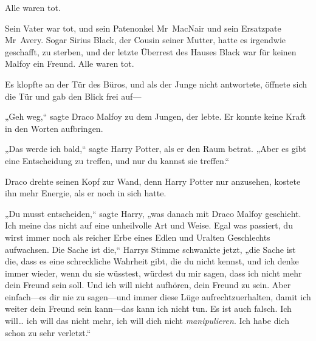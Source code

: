Alle waren tot.

Sein Vater war tot, und sein Patenonkel Mr~MacNair und sein Ersatzpate Mr~Avery. Sogar Sirius Black, der Cousin seiner Mutter, hatte es irgendwie geschafft, zu sterben, und der letzte Überrest des Hauses Black war für keinen Malfoy ein Freund. Alle waren tot.

Es klopfte an der Tür des Büros, und als der Junge nicht antwortete, öffnete sich die Tür und gab den Blick frei auf—

„Geh weg,“ sagte Draco Malfoy zu dem Jungen, der lebte. Er konnte keine Kraft in den Worten aufbringen.

„Das werde ich bald,“ sagte Harry Potter, als er den Raum betrat. „Aber es gibt eine Entscheidung zu treffen, und nur du kannst sie treffen.“

Draco drehte seinen Kopf zur Wand, denn Harry Potter nur anzusehen, kostete ihn mehr Energie, als er noch in sich hatte.

„Du musst entscheiden,“ sagte Harry, „was danach mit Draco Malfoy geschieht. Ich meine das nicht auf eine unheilvolle Art und Weise. Egal was passiert, du wirst immer noch als reicher Erbe eines Edlen und Uralten Geschlechts aufwachsen. Die Sache ist die,“ Harrys Stimme schwankte jetzt, „die Sache ist die, dass es eine schreckliche Wahrheit gibt, die du nicht kennst, und ich denke immer wieder, wenn du sie wüsstest, würdest du mir sagen, dass ich nicht mehr dein Freund sein soll. Und ich will nicht aufhören, dein Freund zu sein. Aber einfach—es dir nie zu sagen—und immer diese Lüge aufrechtzuerhalten, damit ich weiter dein Freund sein kann—das kann ich nicht tun. Es ist auch falsch. Ich will… ich will das nicht mehr, ich will dich nicht \emph{manipulieren}. Ich habe dich schon zu sehr verletzt.“

